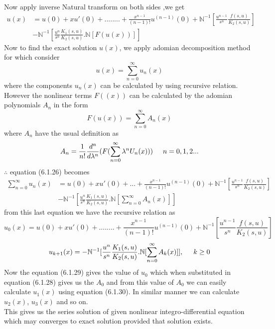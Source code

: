 Now apply inverse Natural transform on both sides ,we get
\begin{align}
u(x)& = u(0) + x u'(0) + ........+ \frac{x^{n-1}}{(n-1)!}u^{(n-1)}(0) + \mathbb{N}^{-1}[\frac{u^{n-1}}{s^n} \frac{f(s,u)}{K_{2}(s,u)}] \nonumber\\
&- \mathbb{N}^{-1}[\frac{u^{n}}{s^n}\frac{K_{1}(s,u)}{K_{2}(s,u)}.\mathbb{N}[F(u(x))]] 
\end{align}
Now to find the exact solution $u(x)$, we apply adomian decomposition method for which consider
\begin{equation}
{u(x) = \sum_{n=0}^{\infty} u_{n}(x)}
\end{equation}
where the components $u_{n}(x)$ can be calculated by using recursive relation. However the nonlinear terms $F((x))$ can be calculated by the adomian polynomials $A_{n}$ in the form
\begin{equation*}
 F(u(x)) = \sum_{n=0}^{\infty} A_{n}(x)
 \end{equation*}
 where $A_{n}$ have the usual definition as
 \begin{equation}
 A_{n} = \frac{1}{n!}\frac{d^n}{d\lambda^n}(F(\sum_{n=0}^{\infty} \lambda^nU_{n}(x)))   {\hspace{0.5 cm}}   n = 0,1,2...
 \end{equation}    
 $\therefore$ equation (6.1.26) becomes
 \begin{align*}
 \sum_{n=0}^{\infty} u_{n}(x)& = u(0) + x u'(0) +...+ \frac{x^{n-1}}{(n-1)!}u^{(n-1)}(0) +  \mathbb{N}^{-1}[\frac{u^{n-1}}{s^n} \frac{f(s,u)}{K_{2}(s,u)}] \nonumber\\
&-  \mathbb{N}^{-1}[\frac{u^{n}}{s^n}\frac{K_{1}(s,u)}{K_{2}(s,u)}.\mathbb{N}[\sum_{n=0}^{\infty} A_{n}(x)]]
 \end{align*}
 from this last equation we have the recursive relation as
 \begin{equation}
{  u_{0}(x) = u(0) + x u'(0) + ........+ \frac{x^{n-1}}{(n-1)!}u^{(n-1)}(0) + \mathbb{N}^{-1}[\frac{u^{n-1}}{s^n} \frac{f(s,u)}{K_{2}(s,u)}]}
 \end{equation}
 \begin{equation}
 u_{k+1}(x) = -  \mathbb{N}^{-1}[\frac{u^{n}}{s^n}\frac{K_{1}(s,u)}{K_{2}(s,u)}.\mathbb{N}[\sum_{n=0}^{\infty} A_{k}(x)]]  ,{\hspace{0.5 cm}} k \geq 0 \end{equation}
 Now the equation (6.1.29) gives the value of $u_{0}$ which when substituted in equation (6.1.28) gives us the $A_{0}$ and from this value of $ A_{0}$ we can easily calculate $u_{1}(x)$ using equation (6.1.30). In similar manner we can calculate $u_{2}(x)$, $u_{3}(x)$ and so on.\\
    This gives us the series solution of given nonlinear integro-differential equation which may converges to exact solution provided that solution exists.
